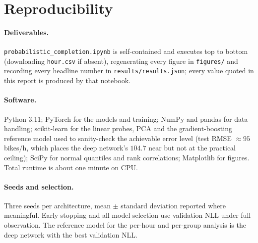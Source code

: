 \documentclass[11pt,a4paper]{article}
\begin{document}
\section{Reproducibility}

\paragraph{Deliverables.}
\texttt{probabilistic\_completion.ipynb} is self-contained and executes top to bottom
(downloading \texttt{hour.csv} if absent), regenerating every figure in \texttt{figures/} and
recording every headline number in \texttt{results/results.json}; every value quoted in this report is
produced by that notebook.

\paragraph{Software.}
Python 3.11; PyTorch for the models and training; NumPy and pandas for data handling; scikit-learn for
the linear probes, PCA and the gradient-boosting reference model used to sanity-check the achievable
error level (test RMSE $\approx95$ bikes/h, which places the deep network's $104.7$ near but not at the
practical ceiling); SciPy for normal quantiles and rank correlations; Matplotlib for figures.
Total runtime is about one minute on CPU.

\paragraph{Seeds and selection.}
Three seeds per architecture, mean $\pm$ standard deviation reported where meaningful. Early stopping
and all model selection use validation NLL under full observation. The reference model for the per-hour
and per-group analysis is the deep network with the best validation NLL.
\end{document}
